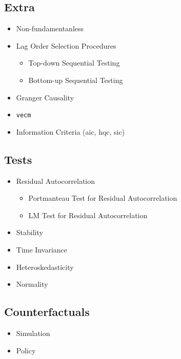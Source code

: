 \documentclass[
]{article}
\providecommand{\tightlist}{%
  \setlength{\itemsep}{0pt}\setlength{\parskip}{0pt}}
\begin{document}
\hypertarget{extra}{%
\subsection{Extra}\label{extra}}

\begin{itemize}
\tightlist
\item
  Non-fundamentanless
\item
  Lag Order Selection Procedures

  \begin{itemize}
  \tightlist
  \item
    Top-down Sequential Testing
  \item
    Bottom-up Sequential Testing
  \end{itemize}
\item
  Granger Causality
\item
  \texttt{vecm}
\item
  Information Criteria (aic, hqc, sic)
\end{itemize}

\hypertarget{tests}{%
\subsection{Tests}\label{tests}}

\begin{itemize}
\tightlist
\item
  Residual Autocorrelation

  \begin{itemize}
  \tightlist
  \item
    Portmanteau Test for Residual Autocorrelation
  \item
    LM Test for Residual Autocorrelation
  \end{itemize}
\item
  Stability
\item
  Time Invariance
\item
  Heteroskedasticity
\item
  Normality
\end{itemize}

\hypertarget{counterfactuals}{%
\subsection{Counterfactuals}\label{counterfactuals}}

\begin{itemize}
\tightlist
\item
  Simulation
\item
  Policy
\end{itemize}
\end{document}
